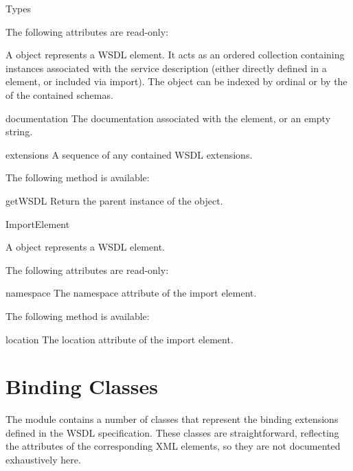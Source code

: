 \begin{classdesc}{Types}{}

The following attributes are read-only:

A  object represents a WSDL  element. It acts 
as an ordered collection containing  instances associated 
with the service description (either directly defined in a  
element, or included via import). The  object can be indexed 
by ordinal or by the  of the contained schemas.

\begin{memberdesc}{documentation}
The documentation associated with the element, or an empty string.
\end{memberdesc}

\begin{memberdesc}{extensions}
A sequence of any contained WSDL extensions.
\end{memberdesc}

The following method is available:

\begin{methoddesc}{getWSDL}{}
Return the parent  instance of the object.
\end{methoddesc}
\end{classdesc}

\begin{classdesc}{ImportElement}{}

A  object represents a WSDL  element.

The following attributes are read-only:

\begin{memberdesc}{namespace}
The namespace attribute of the import element.
\end{memberdesc}

The following method is available:

\begin{memberdesc}{location}
The location attribute of the import element.
\end{memberdesc}
\end{classdesc}


\section{Binding Classes}

The  module contains a number of classes that represent 
the binding extensions defined in the WSDL specification. These classes 
are straightforward, reflecting the attributes of the corresponding 
XML elements, so they are not documented exhaustively here.


